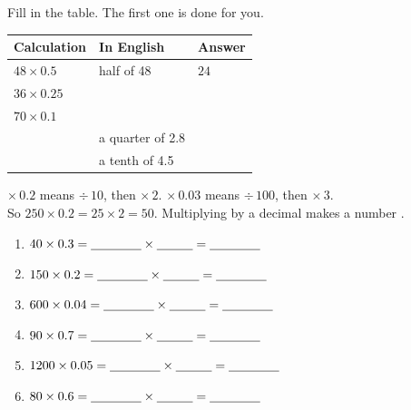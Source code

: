 \documentclass[12pt,a4paper]{article}
\newif\iffr
\newcommand{\fr}[1]{\unskip\iffr\par\vspace{1pt}\noindent{\small\itshape\color{black!60}#1}\par\fi}
\newcommand{\fq}[1]{\guillemotleft\,#1\,\guillemotright}
\newcommand{\tall}{\rule[-0.6em]{0pt}{1.9em}}
\renewcommand{\tall}{\rule[-0.8em]{0pt}{2.4em}}
\begin{document}
\vspace{2pt}
\noindent\begin{minipage}{\textwidth}
Fill in the table. The first one is done for you.
\fr{Compl\`ete le tableau (la premi\`ere ligne est faite pour toi). Remplis la
colonne \fq{In English} en anglais.}

\vspace{4pt}
\noindent
\begin{tabularx}{\textwidth}{|C{3.4cm}|L|C{2.6cm}|}
  \hline
  \textbf{Calculation} & \textbf{In English} & \textbf{Answer} \\
  \hline
  $48 \times 0.5$ \tall & half of 48 & $24$ \\ \hline
  $36 \times 0.25$ \tall & & \\ \hline
  $70 \times 0.1$ \tall & & \\ \hline
  \tall & a quarter of 2.8 & \\ \hline
  \tall & a tenth of 4.5 & \\ \hline
\end{tabularx}
\end{minipage}


\begin{remember}
  $\times\, 0.2$ means $\div\, 10$, then $\times\, 2$. \quad
  $\times\, 0.03$ means $\div\, 100$, then $\times\, 3$. \\
  So \; $250 \times 0.2 = 25 \times 2 = 50$. \;
  Multiplying by a decimal  makes a number .
  \fr{Divise d'abord, puis multiplie. Multiplier par un nombre d\'ecimal inf\'erieur
  \`a 1 donne un r\'esultat plus petit (\eng{smaller}).}
\end{remember}

\vspace{4pt}
\begin{multicols}{2}
\begin{enumerate}[label=(\alph*), itemsep=12pt]
  \item $40 \times 0.3 = \blank[1.4cm] \times \blank[1.0cm] = \blank[1.4cm]$
  \item $150 \times 0.2 = \blank[1.4cm] \times \blank[1.0cm] = \blank[1.4cm]$
  \item $600 \times 0.04 = \blank[1.4cm] \times \blank[1.0cm] = \blank[1.4cm]$
  \item $90 \times 0.7 = \blank[1.4cm] \times \blank[1.0cm] = \blank[1.4cm]$
  \item $1200 \times 0.05 = \blank[1.4cm] \times \blank[1.0cm] = \blank[1.4cm]$
  \item $80 \times 0.6 = \blank[1.4cm] \times \blank[1.0cm] = \blank[1.4cm]$
\end{enumerate}
\end{multicols}
\end{document}
